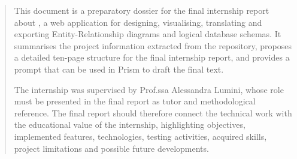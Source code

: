 
\begin{abstract}

This document is a preparatory dossier for the final internship report about \builder, a web application for designing, visualising, translating and exporting Entity-Relationship diagrams and logical database schemas. It summarises the project information extracted from the repository, proposes a detailed ten-page structure for the final internship report, and provides a prompt that can be used in Prism to draft the final text.

The internship was supervised by Prof.ssa Alessandra Lumini, whose role must be presented in the final report as tutor and methodological reference. The final report should therefore connect the technical work with the educational value of the internship, highlighting objectives, implemented features, technologies, testing activities, acquired skills, project limitations and possible future developments.

\end{abstract}
